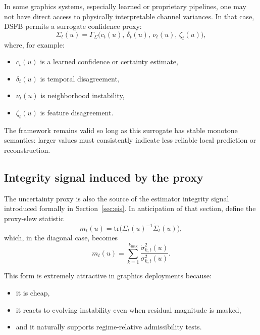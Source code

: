 \documentclass[11pt,letterpaper]{article}
\theoremstyle{gcresult}
\theoremstyle{definition}
\begin{document}
In some graphics systems, especially learned or proprietary pipelines, one may not have direct access to physically interpretable channel variances. In that case, DSFB permits a surrogate confidence proxy:
\begin{equation}
\Sigma_t(u)=\Gamma_{\Sigma}\!\bigl(
c_t(u),\,
\delta_t(u),\,
\nu_t(u),\,
\zeta_t(u)
\bigr),
\end{equation}
where, for example:
\begin{itemize}[leftmargin=1.5em]
    \item $c_t(u)$ is a learned confidence or certainty estimate,
    \item $\delta_t(u)$ is temporal disagreement,
    \item $\nu_t(u)$ is neighborhood instability,
    \item $\zeta_t(u)$ is feature disagreement.
\end{itemize}

The framework remains valid so long as this surrogate has stable monotone semantics: larger values must consistently indicate less reliable local prediction or reconstruction.


\subsection{Integrity signal induced by the proxy}

The uncertainty proxy is also the source of the estimator integrity signal introduced formally in Section~\ref{sec:eis}. In anticipation of that section, define the proxy-slew statistic
\begin{equation}
m_t(u)=\mathrm{tr}\!\bigl(\Sigma_t(u)^{-1}\dot{\Sigma}_t(u)\bigr),
\end{equation}
which, in the diagonal case, becomes
\begin{equation}
m_t(u)=\sum_{k=1}^{k_{\max}} \frac{\dot{\sigma}^{2}_{k,t}(u)}{\sigma^{2}_{k,t}(u)}.
\end{equation}

This form is extremely attractive in graphics deployments because:
\begin{itemize}[leftmargin=1.5em]
    \item it is cheap,
    \item it reacts to evolving instability even when residual magnitude is masked,
    \item and it naturally supports regime-relative admissibility tests.
\end{itemize}
\end{document}
